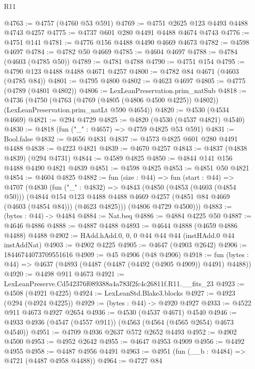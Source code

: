\begin{lexlean}{R11}
\begin{coremodule}
@4763 := @4757 (@4760 @53 @591)
@4769 := @4751 @2625 @123 @4493 @4488 @4743 @4257
@4775 := @4737 @601 @280 @4491 @4488 @4674 @4743
@4776 := @4751 @141
@4781 := @4776 @156 @4488 @4490 @4669 @4673
@4782 := @4598 @4697
@4784 := @4782 @50 @4669
@4785 := @4604 @4697
@4788 := @4784 (@4603 (@4785 @50))
@4789 := @4781 @4788
@4790 := @4751 @154
@4795 := @4790 @123 @4488 @4488 @4671 @4257
@4800 := @4782 @84 @4671 (@4603 (@4785 @84))
@4801 := @4795 @4800
@4802 := @4623 @4697
@4805 := @4775 (@4789 (@4801 @4802))
@4806 := LexLeanPreservation.prim_natSub
@4818 := @4736
    (@4750
      (@4763 (@4769 (@4805 (@4806 @4500 @4225)) @4802))
      (LexLeanPreservation.prim_natLt @590 @4654))
@4820 := @4530 (@4534 @4669)
@4821 := @294 @4729
@4825 := @4820 (@4530 (@4537 @4821) @4540)
@4830 := @4818 (fun ("_" : @4657) => @4759 @4825 @53 @591)
@4831 := Bool.false
@4832 := @4656 @4831
@4837 := @4573 @4825 @601 @280 @4491 @4488
@4838 := @4223 @4821
@4839 := @4670 @4257
@4843 := @4837 (@4838 @4839) (@294 @4731)
@4844 := @4589 @4825
@4850 := @4844 @141 @156 @4488 @4490 @4821 @4839
@4851 := @4598 @4825
@4853 := @4851 @50 @4821
@4854 := @4604 @4825
@4882 := fun (size : @44) =>
  fun (start : @44) =>
  @4707
    (@4830
      (fun ("_" : @4832) =>
      @4843
        (@4850
          (@4853 (@4603 (@4854 @50)))
          (@4844
            @154
            @123
            @4488
            @4488
            @4669
            @4257
            (@4851 @84 @4669 (@4603 (@4854 @84)))
            (@4623 @4825)))
        (@4806 @4729 @4500)))
@4883 := (bytes : @44) -> @4484
@4884 := Nat.beq
@4886 := @4884 @4225 @50
@4887 := @4646 @4886
@4888 := @4887 @4488
@4893 := @4644 @4888 (@4659 @4886 @4488) @4488
@4902 := HAdd.hAdd.{0, 0, 0} @44 @44 @44 (instHAdd.{0} @44 instAddNat)
@4903 := @4902 @4225
@4905 := @4647 (@4903 @2642)
@4906 := 18446744073709551616
@4909 := @45 @4906 (@48 @4906)
@4918 := fun (bytes : @44) => @4637 (@4893 (@4487 (@4487 (@4492 (@4905 @4909)) @4491) @4488))
@4920 := @4498 @911 @4673
@4921 := LexLeanPreserve.Cd542376f089388a4a783f2fc4c26811f.R11.__fits_23
@4923 := @4508 (@4921 @4225)
@4924 := LexLeanStd.Blake3.blocks
@4927 := @4923 (@294 (@4924 @4225))
@4929 := (bytes : @44) -> @4920 @4927
@4933 := @4522 @911 @4673 @4927 @2654
@4936 := @4530 (@4537 @4671) @4540
@4946 := @4933 @4936 (@4547 (@4557 @911)) (@4563 (@4564 (@4565 @2654) @4673 @4540))
@4951 := @4709 @4936 @2637 @572 @2652 @4493
@4952 := @4902 @4500
@4953 := @4952 @2642
@4955 := @4647 @4953 @4909
@4956 := @4492 @4955
@4958 := @4487 @4956 @4491
@4963 := @4951 (fun (__b : @4484) => @4721 (@4487 @4958 @4488))
@4964 := @4727 @84

\end{coremodule}
\end{lexlean}
